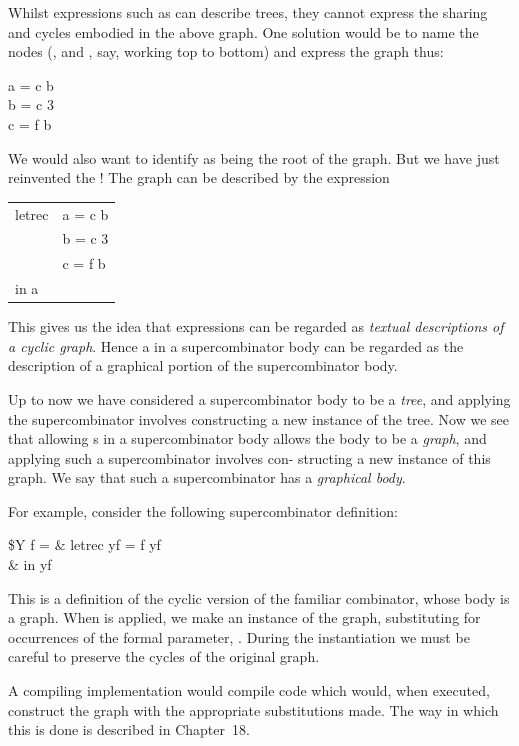 \noindent
Whilst expressions such as  can describe trees, they cannot express
the sharing and cycles embodied in the above graph. One solution would be to
name the nodes (,  and , say, working top to bottom) and express the
graph thus:
\begin{mlcoded}
    a = c b \\
    b = c 3 \\
    c = f b
\end{mlcoded}
We would also want to identify  as being the root of the graph. But we have
just reinvented the ! The graph can be described by the  expression
\begin{mlcoded}
    \begin{tabular}{@{}l@{\;}l@{}}
        letrec & a = c b \\
        & b = c 3 \\
        & c = f b \\
        in a
    \end{tabular}
\end{mlcoded}
This gives us the idea that  expressions can be regarded as \textit{textual
    descriptions of a cyclic graph}. Hence a  in a supercombinator body can be
regarded as the description of a graphical portion of the supercombinator
body.

Up to now we have considered a supercombinator body to be a \textit{tree}, and
applying the supercombinator involves constructing a new instance of the
tree. Now we see that allowing s in a supercombinator body allows the
body to be a \textit{graph}, and applying such a supercombinator involves con-
structing a new instance of this graph. We say that such a supercombinator has
a \textit{graphical body}.

For example, consider the following supercombinator definition:
\begin{letalign}
        \$Y f = & letrec yf = f yf \\
        & in yf
\end{letalign}
This is a definition of the cyclic version of the familiar  combinator, whose
body is a graph. When  is applied, we make an instance of the graph,
substituting for occurrences of the formal parameter, . During the
instantiation we must be careful to preserve the cycles of the original graph.

A compiling implementation would compile code which would, when
executed, construct the graph with the appropriate substitutions made. The
way in which this is done is described in Chapter~18.

